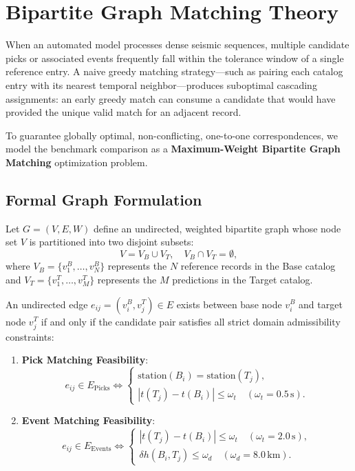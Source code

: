 \section{Bipartite Graph Matching Theory}
\label{sec:bipartite_matching}

When an automated model processes dense seismic sequences, multiple candidate picks or associated events frequently fall within the tolerance window of a single reference entry. A naive greedy matching strategy---such as pairing each catalog entry with its nearest temporal neighbor---produces suboptimal cascading assignments: an early greedy match can consume a candidate that would have provided the unique valid match for an adjacent record.

To guarantee globally optimal, non-conflicting, one-to-one correspondences, we model the benchmark comparison as a \textbf{Maximum-Weight Bipartite Graph Matching} optimization problem.

\subsection{Formal Graph Formulation}
Let $G = (V, E, W)$ define an undirected, weighted bipartite graph whose node set $V$ is partitioned into two disjoint subsets:
\begin{equation}
  V = V_B \cup V_T, \quad V_B \cap V_T = \emptyset,
\end{equation}
where $V_B = \{v_1^B, \dots, v_N^B\}$ represents the $N$ reference records in the Base catalog and $V_T = \{v_1^T, \dots, v_M^T\}$ represents the $M$ predictions in the Target catalog.

An undirected edge $e_{ij} = (v_i^B, v_j^T) \in E$ exists between base node $v_i^B$ and target node $v_j^T$ if and only if the candidate pair satisfies all strict domain admissibility constraints:
\begin{enumerate}
  \item \textbf{Pick Matching Feasibility}:
  \begin{equation}
    e_{ij} \in E_{\mathrm{Picks}} \iff \begin{cases}
      \mathrm{station}(B_i) = \mathrm{station}(T_j), \\
      |t(T_j) - t(B_i)| \le \omega_t \quad (\omega_t = 0.5\,\mathrm{s}).
    \end{cases}
  \end{equation}
  \item \textbf{Event Matching Feasibility}:
  \begin{equation}
    e_{ij} \in E_{\mathrm{Events}} \iff \begin{cases}
      |t(T_j) - t(B_i)| \le \omega_t \quad (\omega_t = 2.0\,\mathrm{s}), \\
      \delta h(B_i, T_j) \le \omega_d \quad (\omega_d = 8.0\,\mathrm{km}).
    \end{cases}
  \end{equation}
\end{enumerate}

